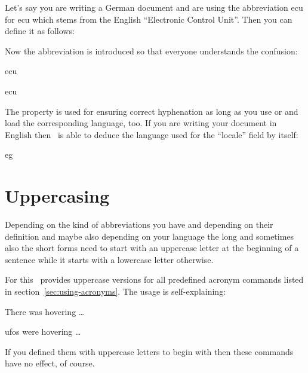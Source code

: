 \documentclass{acro-manual}
\begin{document}
Let's say you are writing a German document and are using the abbreviation
\acs*{ecu} for \acl*{ecu} which stems from the English \enquote{Electronic
  Control Unit}.  Then you can define it as follows:
\begin{sourcecode}
\end{sourcecode}
Now the abbreviation is introduced so that everyone understands the confusion:
\begin{example}
  \ac{ecu} \par
  \acf{ecu}
\end{example}

The property  is used for ensuring correct hyphenation
as long as you use  or  and load the corresponding
language, too.  If you are writing your document in English then \acro\ is
able to deduce the language used for the \enquote{locale} field by itself:
\begin{sourcecode}
\end{sourcecode}
\begin{example}
  \acf{eg}
\end{example}

\section{Uppercasing}\label{sec:uppercasing}

Depending on the kind of abbreviations you have and depending on their
definition and maybe also depending on your language the long and sometimes
also the short forms need to start with an uppercase letter at the beginning
of a sentence while it starts with a lowercase letter otherwise.

For this \acro\ provides uppercase versions for all predefined acronym
commands listed in section~\ref{sec:using-acronyms}.  The usage is
self-explaining:
\begin{example}
  There was  hovering \dots \par
  \Aclp{ufo} were hovering \dots
\end{example}
If you defined them with uppercase letters to begin with then these commands
have no effect, of course.
\begin{sourcecode}
\end{sourcecode}
\end{document}
